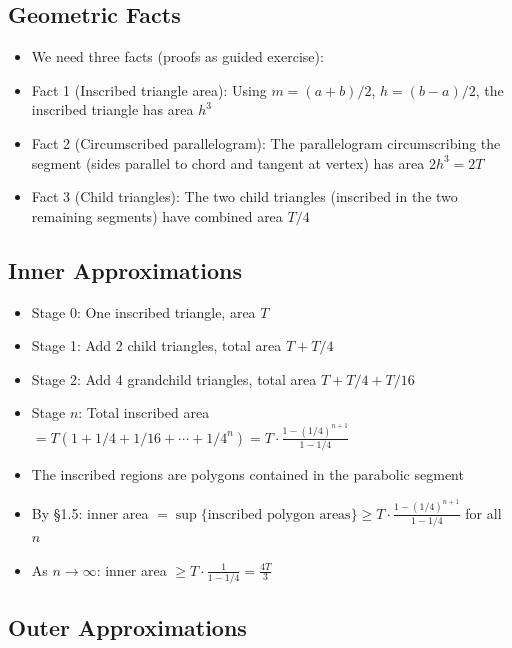 \documentclass[
  10pt,
  letterpaper,
]{scrbook}
\providecommand{\tightlist}{%
  \setlength{\itemsep}{0pt}\setlength{\parskip}{0pt}}
\begin{document}
\subsection{Geometric Facts}\label{geometric-facts}

\begin{itemize}
\tightlist
\item
  We need three facts (proofs as guided exercise):
\item
  Fact 1 (Inscribed triangle area): Using \(m = (a+b)/2\),
  \(h = (b-a)/2\), the inscribed triangle has area \(h^3\)
\item
  Fact 2 (Circumscribed parallelogram): The parallelogram circumscribing
  the segment (sides parallel to chord and tangent at vertex) has area
  \(2h^3 = 2T\)
\item
  Fact 3 (Child triangles): The two child triangles (inscribed in the
  two remaining segments) have combined area \(T/4\)
\end{itemize}

\subsection{Inner Approximations}\label{inner-approximations}

\begin{itemize}
\tightlist
\item
  Stage 0: One inscribed triangle, area \(T\)
\item
  Stage 1: Add 2 child triangles, total area \(T + T/4\)
\item
  Stage 2: Add 4 grandchild triangles, total area \(T + T/4 + T/16\)
\item
  Stage \(n\): Total inscribed area
  \(= T(1 + 1/4 + 1/16 + \cdots + 1/4^n) = T \cdot \frac{1 - (1/4)^{n+1}}{1 - 1/4}\)
\item
  The inscribed regions are polygons contained in the parabolic segment
\item
  By §1.5: inner area
  \(= \sup\{\text{inscribed polygon areas}\} \geq T \cdot \frac{1 - (1/4)^{n+1}}{1 - 1/4}\)
  for all \(n\)
\item
  As \(n \to \infty\): inner area
  \(\geq T \cdot \frac{1}{1 - 1/4} = \frac{4T}{3}\)
\end{itemize}

\subsection{Outer Approximations}\label{outer-approximations}
\end{document}
